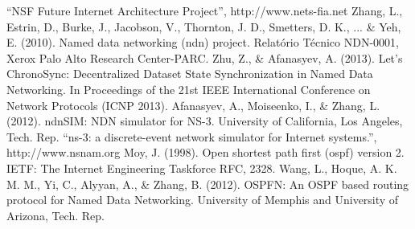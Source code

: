 \documentclass[a4paper]{article}
\begin{document}
\begin{thebibliography}{1}

``NSF Future Internet Architecture Project'', http://www.nets-fia.net
Zhang, L., Estrin, D., Burke, J., Jacobson, V., Thornton, J. D., Smetters, D. K., ... \& Yeh, E. (2010).
Named data networking (ndn) project. Relatório Técnico NDN-0001, Xerox Palo Alto Research Center-PARC.
Zhu, Z., \& Afanasyev, A. (2013).
Let’s ChronoSync: Decentralized Dataset State Synchronization in Named Data Networking.
In Proceedings of the 21st IEEE International Conference on Network Protocols (ICNP 2013).
Afanasyev, A., Moiseenko, I., \& Zhang, L. (2012).
ndnSIM: NDN simulator for NS-3. University of California, Los Angeles, Tech. Rep.
``ns-3: a discrete-event network simulator for Internet systems.'', http://www.nsnam.org
Moy, J. (1998). Open shortest path first (ospf) version 2. IETF: The Internet Engineering Taskforce RFC, 2328.
Wang, L., Hoque, A. K. M. M., Yi, C., Alyyan, A., \& Zhang, B. (2012).
OSPFN: An OSPF based routing protocol for Named Data Networking.
University of Memphis and University of Arizona, Tech. Rep.
\end{thebibliography}
\end{document}
